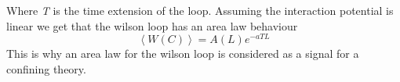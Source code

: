 \documentclass[11pt,a4paper]{article}
\begin{document}

Where \emph{T} is the time extension of the loop. Assuming the interaction potential is linear we get that the wilson loop has an area law behaviour
\begin{equation}
\left\langle W\left(C\right)\right\rangle=A\left(L\right)e^{-aTL}
\end{equation}
This is why an area law for the wilson loop is considered as a signal for a confining theory.
\end{document}
